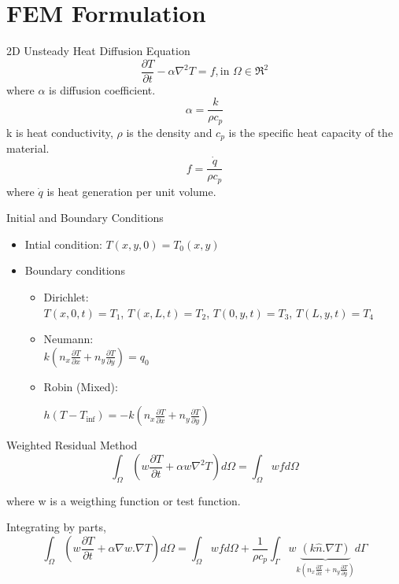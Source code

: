 \documentclass[t,english]{beamer}
\begin{document}
\section{FEM Formulation}
\begin{frame}{2D Unsteady Heat Diffusion Equation}
$$\frac{\partial T}{\partial t}-\alpha \nabla^2T =f , \text{in }  \Omega \in \Re^2 $$ 
where $\alpha$ is diffusion coefficient.
$$ \alpha = \frac{k}{\rho c_p}$$
k is heat conductivity, $\rho$ is the density and $c_p$  is the specific heat capacity of the material.
$$ f = \frac{\dot{q}}{\rho c_p}$$
where $\dot{q}$ is heat generation per unit volume.
\end{frame}

\begin{frame}{Initial and Boundary Conditions}
\begin{itemize}
\item Intial condition:
	$T(x,y,0) = T_0(x,y)$
\item Boundary conditions
	\begin{itemize}
	\item Dirichlet:
	 \\
		$T(x,0,t) = T_1$, $T(x,L,t) = T_2$, $T(0,y,t) = T_3$, $T(L,y,t) = T_4$
	\\
	\item Neumann:
	\\
$k\left(n_x\frac{\partial T}{\partial x} + n_y\frac{\partial T}{\partial y}\right) = q_0$
	\\
	\item Robin (Mixed):
	
	$h(T-T_{\inf}) = -k\left(n_x\frac{\partial T}{\partial x} + n_y\frac{\partial T}{\partial y}\right)$
	\end{itemize}
\end{itemize}
\end{frame}

\begin{frame}[c]{Weighted Residual Method}
$$\int_\Omega (w \frac{\partial T}{\partial t}  +\alpha w\nabla^2T)d\Omega= \int_\Omega wfd\Omega $$
 
where w is a weigthing function or test function.

Integrating by parts,
 $$\int_\Omega (w \frac{\partial T}{\partial t}  +\alpha \nabla w .\nabla T)d\Omega = \int_\Omega wfd\Omega + \frac{1}{\rho c_p}\int_ \Gamma w\underbrace{(k \hat{n}.\nabla T)}_{k(n_x\frac{\partial T}{\partial x} + n_y\frac{\partial T}{\partial y})}d\Gamma $$
\end{frame}
\end{document}
